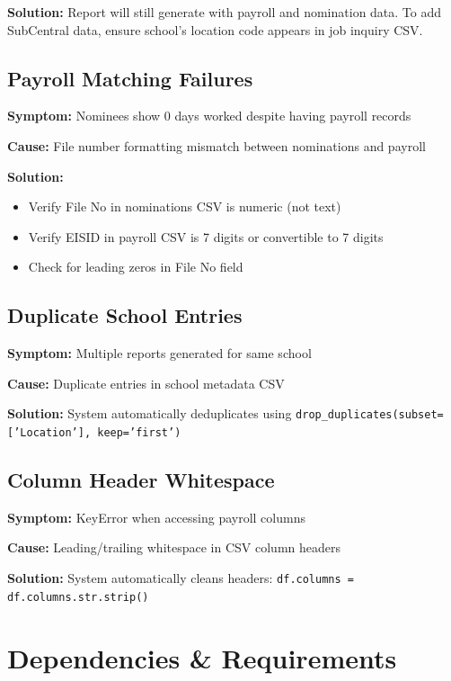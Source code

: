 \documentclass[12pt,letterpaper]{article}
\begin{document}
\textbf{Solution:} Report will still generate with payroll and nomination data. To add SubCentral data, ensure school's location code appears in job inquiry CSV.

\subsection{Payroll Matching Failures}

\textbf{Symptom:} Nominees show 0 days worked despite having payroll records

\textbf{Cause:} File number formatting mismatch between nominations and payroll

\textbf{Solution:} 
\begin{itemize}[leftmargin=*]
    \item Verify File No in nominations CSV is numeric (not text)
    \item Verify EISID in payroll CSV is 7 digits or convertible to 7 digits
    \item Check for leading zeros in File No field
\end{itemize}

\subsection{Duplicate School Entries}

\textbf{Symptom:} Multiple reports generated for same school

\textbf{Cause:} Duplicate entries in school metadata CSV

\textbf{Solution:} System automatically deduplicates using \texttt{drop\_duplicates(subset=['Location'], keep='first')}

\subsection{Column Header Whitespace}

\textbf{Symptom:} KeyError when accessing payroll columns

\textbf{Cause:} Leading/trailing whitespace in CSV column headers

\textbf{Solution:} System automatically cleans headers: \texttt{df.columns = df.columns.str.strip()}

\section{Dependencies \& Requirements}
\end{document}
